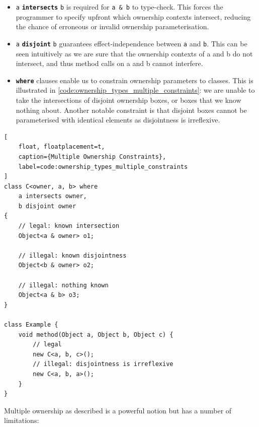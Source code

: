 \documentclass{acm_proc_article-sp}
\begin{document}
\begin{itemize}

	\item \lstinline{a} \textbf{\lstinline|intersects|} \lstinline{b} is
		required for \lstinline|a & b| to type-check. This forces the programmer
		to specify upfront which ownership contexts intersect, reducing the
		chance of erroneous or invalid ownership parameterisation.

	\item \lstinline{a} \textbf{\lstinline|disjoint|} \lstinline{b} guarantees
		effect-independence between \lstinline{a} and \lstinline{b}. This can be
		seen intuitively as we are sure that the ownership contexts of a and b
		do not intersect, and thus method calls on a and b cannot interfere.

	\item \textbf{\lstinline|where|} clauses enable us to constrain ownership
		parameters to classes. This is illustrated in
		\cref{code:ownership_types_multiple_constraints}: we are unable to take
		the intersections of disjoint ownership boxes, or boxes that we know
		nothing about. Another notable constraint is that disjoint boxes cannot
		be parameterised with identical elements as disjointness is irreflexive.

\end{itemize}

\begin{lstlisting}[
	float, floatplacement=t,
	caption={Multiple Ownership Constraints},
	label=code:ownership_types_multiple_constraints
]
class C<owner, a, b> where
	a intersects owner,
	b disjoint owner
{
	// legal: known intersection
	Object<a & owner> o1;

	// illegal: known disjointness
	Object<b & owner> o2;

	// illegal: nothing known
	Object<a & b> o3;
}

class Example {
	void method(Object a, Object b, Object c) {
		// legal
		new C<a, b, c>();
		// illegal: disjointness is irreflexive
		new C<a, b, a>();
	}
}
\end{lstlisting}

Multiple ownership as described is a powerful notion but has a number of
limitations:
\end{document}
